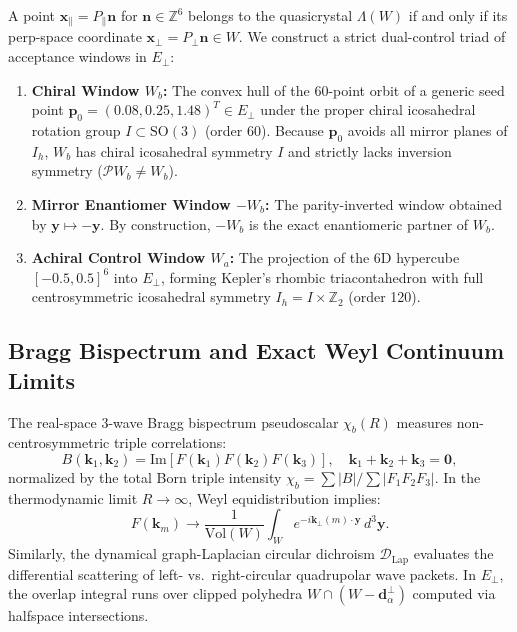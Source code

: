 \documentclass[11pt,a4paper]{article}
\theoremstyle{definition}
\newcommand{\Z}{\mathbb{Z}}
\newcommand{\SO}{\mathrm{SO}}
\begin{document}
A point $\mathbf{x}_\parallel = P_\parallel \mathbf{n}$ for $\mathbf{n} \in \Z^6$ belongs to the quasicrystal $\Lambda(W)$ if and only if its perp-space coordinate $\mathbf{x}_\perp = P_\perp \mathbf{n} \in W$. We construct a strict dual-control triad of acceptance windows in $E_\perp$:
\begin{enumerate}
    \item \textbf{Chiral Window $W_b$:} The convex hull of the 60-point orbit of a generic seed point $\mathbf{p}_0 = (0.08, 0.25, 1.48)^T \in E_\perp$ under the proper chiral icosahedral rotation group $I \subset \SO(3)$ (order 60). Because $\mathbf{p}_0$ avoids all mirror planes of $I_h$, $W_b$ has chiral icosahedral symmetry $I$ and strictly lacks inversion symmetry ($\mathcal{P} W_b \neq W_b$).
    \item \textbf{Mirror Enantiomer Window $-W_b$:} The parity-inverted window obtained by $\mathbf{y} \mapsto -\mathbf{y}$. By construction, $-W_b$ is the exact enantiomeric partner of $W_b$.
    \item \textbf{Achiral Control Window $W_a$:} The projection of the 6D hypercube $[-0.5, 0.5]^6$ into $E_\perp$, forming Kepler's rhombic triacontahedron with full centrosymmetric icosahedral symmetry $I_h = I \times \Z_2$ (order 120).
\end{enumerate}

\subsection{Bragg Bispectrum and Exact Weyl Continuum Limits}

The real-space 3-wave Bragg bispectrum pseudoscalar $\chi_b(R)$ measures non-centrosymmetric triple correlations:
\begin{equation}
B(\mathbf{k}_1, \mathbf{k}_2) = \mathrm{Im}\left[ F(\mathbf{k}_1) F(\mathbf{k}_2) F(\mathbf{k}_3) \right], \quad \mathbf{k}_1 + \mathbf{k}_2 + \mathbf{k}_3 = \mathbf{0},
\end{equation}
normalized by the total Born triple intensity $\chi_b = \sum |B| / \sum |F_1 F_2 F_3|$. In the thermodynamic limit $R \to \infty$, Weyl equidistribution implies:
\begin{equation}
F(\mathbf{k}_m) \longrightarrow \frac{1}{\mathrm{Vol}(W)} \int_W e^{-i \mathbf{k}_\perp(m) \cdot \mathbf{y}} \, d^3\mathbf{y}.
\end{equation}
Similarly, the dynamical graph-Laplacian circular dichroism $\mathcal{D}_{\mathrm{Lap}}$ evaluates the differential scattering of left- vs.\ right-circular quadrupolar wave packets. In $E_\perp$, the overlap integral runs over clipped polyhedra $W \cap (W - \mathbf{d}_\alpha^\perp)$ computed via halfspace intersections.
\end{document}
